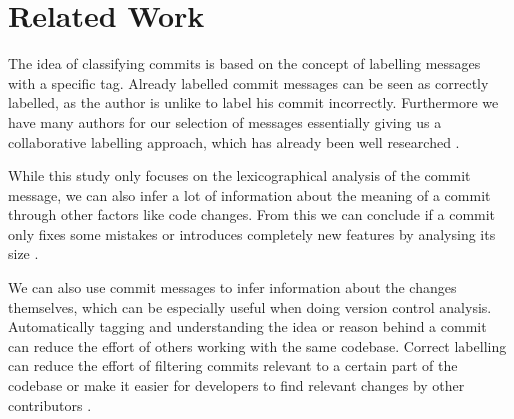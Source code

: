 \section{Related Work}
\label{sec:related-work}

The idea of classifying commits is based on the concept of labelling
messages with a specific tag. Already labelled commit messages can be
seen as correctly labelled, as the author is unlike to label his commit
incorrectly. Furthermore we have many authors for our selection of
messages essentially giving us a collaborative labelling approach,
which has already been well researched \cite{Golder2006}.

While this study only focuses on the lexicographical analysis of the
commit message, we can also infer a lot of information about the meaning
of a commit through other factors like code changes. From this we can
conclude if a commit only fixes some mistakes or introduces completely
new features by analysing its size \cite{Hindle2008}.

We can also use commit messages to infer information about the
changes themselves, which can be especially useful when doing version
control analysis. Automatically tagging and understanding the idea
or reason behind a commit can reduce the effort of others working
with the same codebase. Correct labelling can reduce the effort
of filtering commits relevant to a certain part of the codebase or
make it easier for developers to find relevant changes by other
contributors \cite{Mockus2000}.

